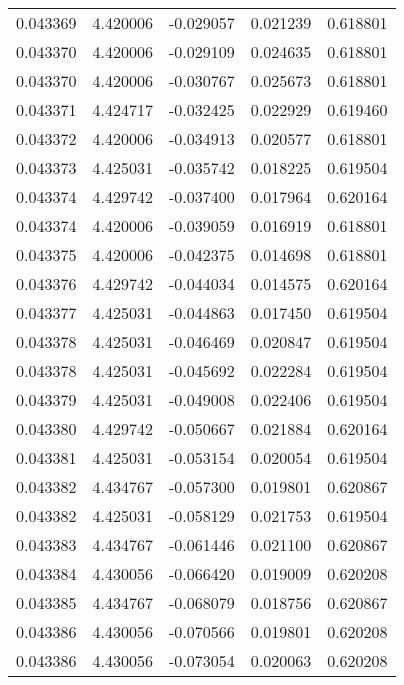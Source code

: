 \begin{tabular}{lrrrr}
0.043369    &  4.420006 & -0.029057 &  0.021239 &             0.618801 \\
0.043370    &  4.420006 & -0.029109 &  0.024635 &             0.618801 \\
0.043370    &  4.420006 & -0.030767 &  0.025673 &             0.618801 \\
0.043371    &  4.424717 & -0.032425 &  0.022929 &             0.619460 \\
0.043372    &  4.420006 & -0.034913 &  0.020577 &             0.618801 \\
0.043373    &  4.425031 & -0.035742 &  0.018225 &             0.619504 \\
0.043374    &  4.429742 & -0.037400 &  0.017964 &             0.620164 \\
0.043374    &  4.420006 & -0.039059 &  0.016919 &             0.618801 \\
0.043375    &  4.420006 & -0.042375 &  0.014698 &             0.618801 \\
0.043376    &  4.429742 & -0.044034 &  0.014575 &             0.620164 \\
0.043377    &  4.425031 & -0.044863 &  0.017450 &             0.619504 \\
0.043378    &  4.425031 & -0.046469 &  0.020847 &             0.619504 \\
0.043378    &  4.425031 & -0.045692 &  0.022284 &             0.619504 \\
0.043379    &  4.425031 & -0.049008 &  0.022406 &             0.619504 \\
0.043380    &  4.429742 & -0.050667 &  0.021884 &             0.620164 \\
0.043381    &  4.425031 & -0.053154 &  0.020054 &             0.619504 \\
0.043382    &  4.434767 & -0.057300 &  0.019801 &             0.620867 \\
0.043382    &  4.425031 & -0.058129 &  0.021753 &             0.619504 \\
0.043383    &  4.434767 & -0.061446 &  0.021100 &             0.620867 \\
0.043384    &  4.430056 & -0.066420 &  0.019009 &             0.620208 \\
0.043385    &  4.434767 & -0.068079 &  0.018756 &             0.620867 \\
0.043386    &  4.430056 & -0.070566 &  0.019801 &             0.620208 \\
0.043386    &  4.430056 & -0.073054 &  0.020063 &             0.620208 \\

\end{tabular}
